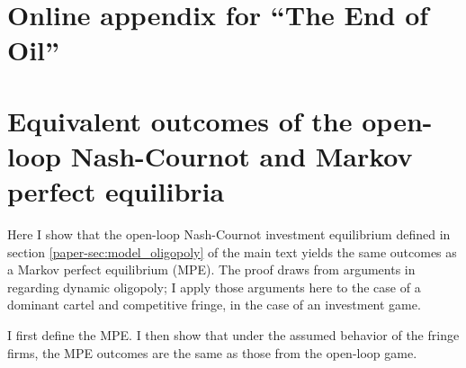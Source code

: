 \documentclass[12pt]{article}
\begin{document}


\onehalfspacing

\appendix
\setcounter{page}{1}
\renewcommand{\thepage}{A-\arabic{page}}
\renewcommand{\theequation}{A.\arabic{equation}}




\section*{Online appendix for ``The End of Oil''}

\section{Equivalent outcomes of the open-loop Nash-Cournot and Markov perfect equilibria} \label{sec:MPE}

Here I show that the open-loop Nash-Cournot investment equilibrium defined in section \ref{paper-sec:model_oligopoly} of the main text yields the same outcomes as a Markov perfect equilibrium (MPE). The proof draws from arguments in \cite{eswaranlewis1985} regarding dynamic oligopoly; I apply those arguments here to the case of a dominant cartel and competitive fringe, in the case of an investment game.

I first define the MPE. I then show that under the assumed behavior of the fringe firms, the MPE outcomes are the same as those from the open-loop game.
\end{document}

